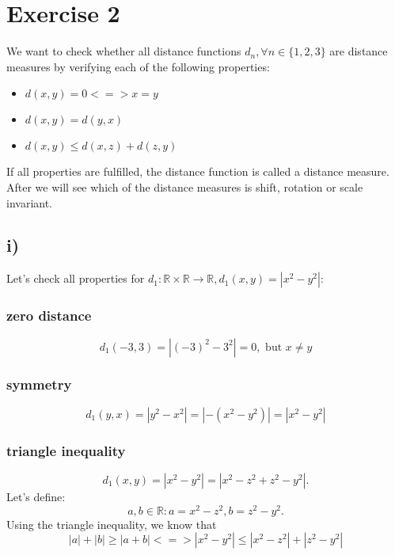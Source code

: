 \section*{Exercise 2} %
\label{sec:section_name}

We want to check whether all distance functions $d_n, \forall n \in \{1,2,3\}$ are distance measures by verifying each of the 
following properties:

\begin{itemize}
	\item $d(x,y)=0 <=> x=y$
	\item $d(x,y) = d(y,x)$
	\item $d(x,y) \leq d(x,z) + d(z,y)$
\end{itemize}

If all properties are fulfilled, the distance function is called a distance measure.
After we will see which of the distance measures is shift, rotation or scale invariant.
\subsection*{i)} %
\label{sub:i}

Let's check all properties for $d_1: \mathbb{R} \times \mathbb{R} \to \mathbb{R}, d_1(x,y) = |x^2 - y^2|$:

\subsubsection*{zero distance} %
\label{ssub:zero_distance}
\[
d_1(-3,3) = |(-3)^2 - 3^2| = 0, \text{ but } x \neq y
\]


\subsubsection*{symmetry} %
\label{ssub:symmetry}

\[
d_1(y,x) = |y^2 - x^2| = |-(x^2 - y^2)| = |x^2 - y^2|
\]


\subsubsection*{triangle inequality} %
\label{ssub:triangle_inequality}

\[
d_1(x,y) = |x^2 - y^2| = |x^2 - z^2 + z^2 - y^2|.
\] 
Let's define:
\[
a,b \in \mathbb{R}: a = x^2 - z^2, b = z^2 - y^2. 
\]
Using the triangle inequality, we know that 
\[
|a| + |b| \geq |a+b| <=> |x^2 - y^2| \leq |x^2 - z^2| + |z^2 - y^2|
\]

